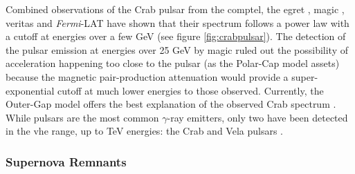 \documentclass[main.tex]{subfiles}
\begin{document}
Combined observations of the Crab pulsar from the \gls{comptel}, the \gls{egret} \cite{2001CrabCOMPTEL}, \gls{magic} \cite{2008crabmagic}, \gls{veritas} \cite{2013CrabPulsarVeritas} and \textit{Fermi}-LAT \cite{2010FermiCrabPulsar} have shown that their spectrum follows a power law with a cutoff at energies over a few GeV (see figure \ref{fig:crabpulsar}). The detection of the pulsar emission at energies over 25 GeV by \gls{magic} ruled out the possibility of acceleration happening too close to the pulsar (as the Polar-Cap model assets) because the magnetic pair-production attenuation would provide a super-exponential cutoff at much lower energies to those observed. Currently, the Outer-Gap model offers the best explanation of the observed Crab spectrum \cite{2008gapmodels}.\\
While pulsars are the most common $\gamma$-ray emitters, only two have been detected in the \gls{vhe} range, up to TeV energies: the Crab and Vela pulsars \cite{Gajdus2016The}. 

\subsubsection{Supernova Remnants}\label{sec:SNRs}
\end{document}
